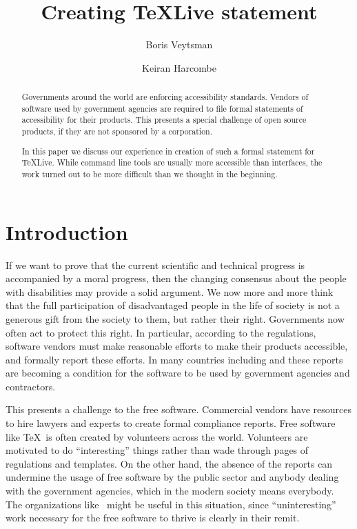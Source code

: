 \documentclass{ltugboat}
\title{Creating \TeX Live \acro{VPAT}\textsuperscript{\textregistered} statement}
\author{Boris Veytsman}
\author{Keiran Harcombe}
\begin{document}
\maketitle

\begin{abstract}
  Governments around the world are enforcing accessibility standards.
  Vendors of software used by government agencies are required to file
  formal statements of accessibility for their products.  This
  presents a special challenge of open source products, if they are
  not sponsored by a corporation.

  In this paper we discuss our experience in creation of such a formal
  statement for \TeX Live.  While command line tools are usually more
  accessible than  interfaces, the work turned out to be
  more difficult than we thought in the beginning.
\end{abstract}

\section{Introduction}
\label{sec:introduction}

If we want to prove that the current scientific and technical progress
is accompanied by a moral progress, then the changing consensus about
the people with disabilities may provide a solid argument.  We now
more and more think that the full participation of disadvantaged
people in the life of society is not a generous gift from the society
to them, but rather their right.  Governments now often act to protect
this right.  In particular, according to the regulations, software
vendors must make reasonable efforts to make their products
accessible, and formally report these efforts.  In many countries
including  and  these reports are becoming a
condition for the software to be used by government agencies and
contractors.  

This presents a challenge to the free software.  Commercial vendors
have resources to hire lawyers and experts to create formal compliance
reports.  Free software like \TeX\ is often created by volunteers
across the world.  Volunteers are motivated to do ``interesting''
things rather than wade through pages of regulations and templates.
On the other hand, the absence of the reports can undermine the usage
of free software by the public sector and anybody dealing with the
government agencies, which in the modern society means everybody.  The
organizations like \tug\ might be useful in this situation, since
``uninteresting'' work necessary for the free software to thrive is
clearly in their remit.
\end{document}
